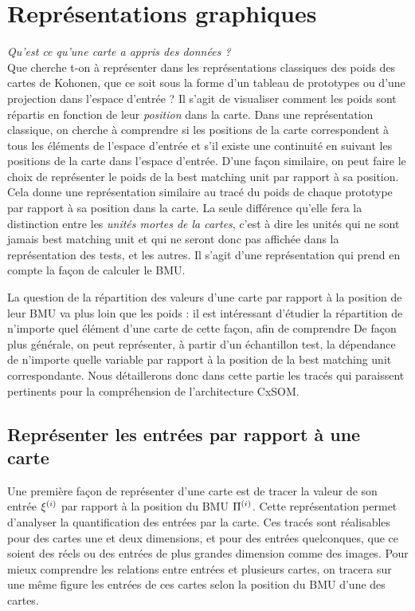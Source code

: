 \section{Représentations graphiques}
\emph{Qu'est ce qu'une carte a appris des données ?}\\
Que cherche t-on à représenter dans les représentations classiques des poids des cartes de Kohonen, que ce soit sous la forme d'un tableau de prototypes ou d'une projection dans l'espace d'entrée ? Il s'agit de visualiser comment les poids sont répartis en fonction de leur \emph{position} dans la carte. Dans une représentation classique, on cherche à comprendre si les positions de la carte correspondent à tous les éléments de l'espace d'entrée et s'il existe une continuité en suivant les positions de la carte dans l'espace d'entrée. D'une façon similaire, on peut faire le choix de représenter le poids de la best matching unit par rapport à sa position. Cela donne une représentation similaire au tracé du poids de chaque prototype par rapport à sa position dans la carte. La seule différence qu'elle fera la distinction entre les \emph{unités mortes de la cartes}, c'est à dire les unités qui ne sont jamais best matching unit et qui ne seront donc pas affichée dans la représentation des tests, et les autres. Il s'agit d'une représentation qui prend en compte la façon de calculer le BMU.

La question de la répartition des valeurs d'une carte par rapport à la position de leur BMU va plus loin que les poids : il est intéressant d'étudier la répartition de n'importe quel élément d'une carte de cette façon, afin de comprendre 
De façon plus générale, on peut représenter, à partir d'un échantillon test, la dépendance de n'importe quelle variable par rapport à la position de la best matching unit correspondante. Nous détaillerons donc dans cette partie les tracés qui paraissent pertinents pour la compréhension de l'architecture CxSOM. 


\subsection{Représenter les entrées par rapport à une carte}

Une première façon de représenter d'une carte est de tracer la valeur de son entrée $\xi^{({i})}$ par rapport à la position du BMU $\Pi^{({i})}$. Cette représentation permet d'analyser la quantification des entrées par la carte. Ces tracés sont réalisables pour des cartes une et deux dimensions, et pour des entrées quelconques, que ce soient des réels ou des entrées de plus grandes dimension comme des images.
Pour mieux comprendre les relations entre entrées et plusieurs cartes, on tracera sur une même figure les entrées de ces cartes selon la position du BMU d'une des cartes.

